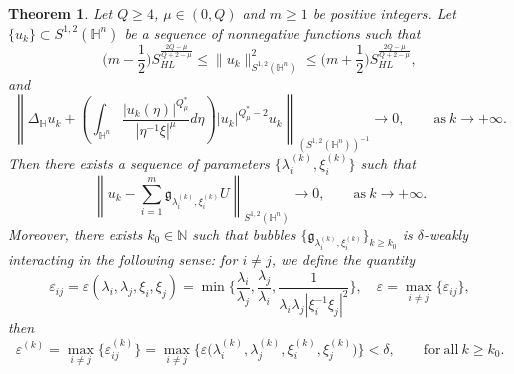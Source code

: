 \documentclass[11pt]{article}
\newtheorem{theorem}{Theorem}[section]
\begin{document}
\begin{theorem}\label{compactness thm}\cite[Theorem 1.8]{ZXW25}
Let $Q\geq4$, $\mu\in(0,Q)$ and $m\geq1$ be positive integers. Let
$\{u_{k}\}\subset S^{1,2}(\mathbb{H}^{n})$ be a sequence of nonnegative functions such that
\begin{equation*}%
	\Big(m-\frac{1}{2}\Big)S_{HL}^{\frac{2Q-\mu}{Q+2-\mu}}\leq \|u_{k}\|_{S^{1,2}(\mathbb{H}^{n})}^{2}\leq \Big(m+\frac{1}{2}\Big)S_{HL}^{\frac{2Q-\mu}{Q+2-\mu}},
\end{equation*}
and
\begin{equation*}%
\left\|\Delta_\mathbb{H} u_{k}+\left(\int_{\mathbb{H}^{n}}\frac{|u_k(\eta)|
^{Q^{\ast}_{\mu}}}{|\eta^{-1}\xi|^{\mu}}{d}\eta\right)|u_k|^{Q_\mu^*-2}u_k\right\|
_{(S^{1,2}(\mathbb{H}^{n}))^{-1}}\longrightarrow 0,\qquad\mathrm{as}~k\rightarrow+\infty.
\end{equation*}
Then there exists a sequence of parameters $\big\{\lambda_{i}^{(k)},\xi_{i}^{(k)}\big\}$ such that
\begin{equation*}
\left\|u_{k}-\mathop{\sum}\limits_{i=1}^{m}\mathfrak{g}_{\lambda_i^{(k)},\xi_i^{(k)}}U
\right\|_{S^{1,2}(\mathbb{H}^{n})}\longrightarrow0,\qquad\mathrm{as}~k\rightarrow+\infty.
\end{equation*}
Moreover, %
there exists $k_0\in \mathbb{N}$ such that bubbles $\big\{\mathfrak{g}_{\lambda_i^{(k)},\xi_i^{(k)}}\big\}_{k\geq k_0}$ is $\delta$-weakly interacting in the following sense: for $i\neq j$,
we define the quantity
\begin{equation*}
  \varepsilon_{ij}=\varepsilon(\lambda_i,\lambda_j,\xi_i,\xi_j)=\min\bigg\{\frac{\lambda_i}{\lambda_j},\frac{\lambda_j}{\lambda_i},
  \frac{1}{\lambda_i\lambda_j|\xi_i^{-1} \xi_j|^2}\bigg\},\quad \varepsilon=\max\limits_{i\neq j}\{\varepsilon_{ij}\},
\end{equation*}
then
\begin{equation*}
 \varepsilon^{(k)}= \max\limits_{i\neq j}\{\varepsilon_{ij}^{(k)}\}=\max\limits_{i\neq j}\Big\{\varepsilon\Big(\lambda_i^{(k)},\lambda_j^{(k)},\xi_i^{(k)},\xi_j^{(k)}\Big)\Big\}< \delta,\qquad \mathrm{for ~ all} ~ k\geq k_0.
\end{equation*}


\end{theorem}
\end{document}
